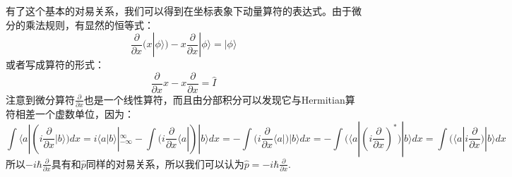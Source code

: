 \documentclass{ctexart}
\begin{document}
有了这个基本的对易关系，我们可以得到在坐标表象下动量算符的表达式。由于微分的乘法规则，有显然的恒等式：
\begin{equation}
\frac{\partial}{\partial x}(x|\phi\rangle)-x\frac{\partial}{\partial x}|\phi\rangle=|\phi\rangle
\end{equation}
或者写成算符的形式：
\begin{equation}
\frac{\partial}{\partial x}x-x\frac{\partial}{\partial x}=\hat{I}
\end{equation}
注意到微分算符$\frac{\partial}{\partial x}$也是一个线性算符，而且由分部积分可以发现它与Hermitian算符相差一个虚数单位，因为：
\begin{equation}
\int\langle a|(i\frac{\partial}{\partial x}|b\rangle) dx=i\langle a|b\rangle|^\infty_{-\infty}-\int(i\frac{\partial}{\partial x}\langle a|)|b\rangle dx=-\int(i\frac{\partial}{\partial x}\langle a|)|b\rangle dx=-\int(\langle a|(i\frac{\partial}{\partial x})^*)|b\rangle dx=\int(\langle a|i\frac{\partial}{\partial x})|b\rangle dx
\end{equation}
所以$-i\hbar\frac{\partial}{\partial x}$具有和$\hat{p}$同样的对易关系，所以我们可以认为$\hat{p}=-i\hbar\frac{\partial}{\partial x}$.
\end{document}
